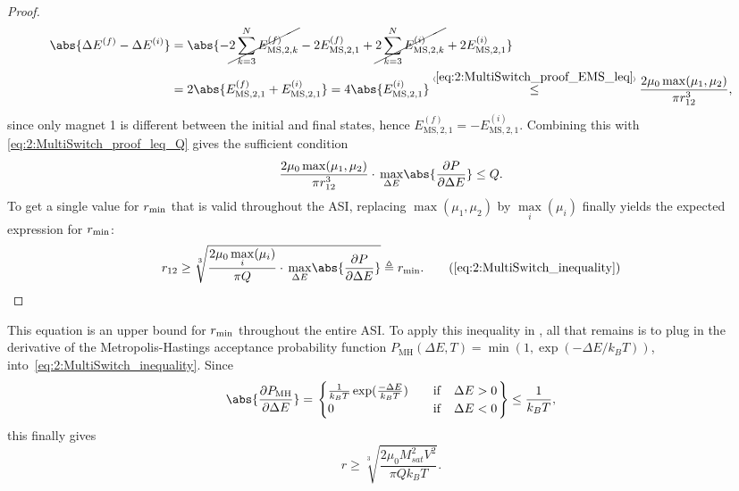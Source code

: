 \begin{proof}
\begin{align*}
		\abs{\Delta E^{(f)} - \Delta E^{(i)}} &= \abs{-\cancel{2 \sum_{k=3}^N E_{\mathrm{MS},2,k}^{(f)}} -2 E_{\mathrm{MS},2,1}^{(f)} +\cancel{2 \sum_{k=3}^N E_{\mathrm{MS},2,k}^{(i)}} +2 E_{\mathrm{MS},2,1}^{(i)}} \\
		&= 2\abs{E_{\mathrm{MS},2,1}^{(f)} + E_{\mathrm{MS},2,1}^{(i)}} = 4 \abs{E_{\mathrm{MS},2,1}^{(i)}} \numeq{\ref{eq:2:MultiSwitch_proof_EMS_leq}}{\leq} \frac{2 \mu_0 \max(\mu_1, \mu_2)}{\pi r_{12}^3} \mathrm{,}
	\end{align*}
	since only magnet 1 is different between the initial and final states, hence $E_{\mathrm{MS},2,1}^{(f)} = - E_{\mathrm{MS},2,1}^{(i)}$.
	Combining this with \eqref{eq:2:MultiSwitch_proof_leq_Q} gives the sufficient condition
	\begin{equation}
		\frac{2 \mu_0 \max(\mu_1, \mu_2)}{\pi r_{12}^3} \cdot \, \underset{\Delta E}{\max} \abs{\frac{\partial P}{\partial \Delta E}} \leq Q \mathrm{.}
	\end{equation}
	To get a single value for $r_\mathrm{min}$ that is valid throughout the ASI, replacing $\max(\mu_1, \mu_2)$ by $\underset{i}{\max}(\mu_i)$ finally yields the expected expression for $r_\mathrm{min}$:
	\begin{equation*}
		r_{12} \geq \sqrt[3]{\frac{2 \mu_0 \, \underset{i}{\max}(\mu_i)}{\pi Q} \cdot \, \underset{\Delta E}{\max} \abs{\frac{\partial P}{\partial \Delta E}}} \triangleq \rmin \mathrm{.} \tag{\ref*{eq:2:MultiSwitch_inequality}}
	\end{equation*}
\end{proof}
This equation is an upper bound for $r_\mathrm{min}$ throughout the entire ASI.
To apply this inequality in \hotspice, all that remains is to plug in the derivative of the Metropolis-Hastings acceptance probability function $P_\mathrm{MH}(\Delta E, T) = \min(1, \exp(-\Delta E/k_B T))$, into~\cref{eq:2:MultiSwitch_inequality}.
Since
\begin{equation}
	\abs{\frac{\partial P_\mathrm{MH}}{\partial \Delta E}} = \left.\begin{cases}
		\frac{1}{k_B T} \exp(\frac{-\Delta E}{k_B T}) \quad &\mathrm{if} \quad \Delta E > 0 \\
		0 \quad &\mathrm{if} \quad \Delta E < 0
	\end{cases} \right\}
	\leq \frac{1}{k_B T} \mathrm{,}
\end{equation}
this finally gives
\begin{equation}
	r \geq \sqrt[3]{\frac{2 \mu_0 M_{sat}^2 V^2}{\pi Q k_B T}} \mathrm{.}
\end{equation}

